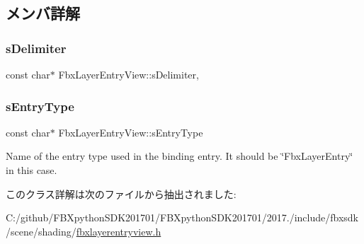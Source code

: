 \subsection{メンバ詳解}
\mbox{\label{class_fbx_layer_entry_view_a2143b40ee433ec7138342298b0cf76f3}} 
\subsubsection{\texorpdfstring{s\+Delimiter}{sDelimiter}}
{\footnotesize\ttfamily const char$\ast$ Fbx\+Layer\+Entry\+View\+::s\+Delimiter\hspace{0.3cm}{\ttfamily [static]}, {\ttfamily [protected]}}

\mbox{\label{class_fbx_layer_entry_view_aa8222d7ad3155f8e83652e030ab22e91}} 
\subsubsection{\texorpdfstring{s\+Entry\+Type}{sEntryType}}
{\footnotesize\ttfamily const char$\ast$ Fbx\+Layer\+Entry\+View\+::s\+Entry\+Type\hspace{0.3cm}{\ttfamily [static]}}

Name of the entry type used in the binding entry. It should be \char`\"{}\+Fbx\+Layer\+Entry\char`\"{} in this case. 

このクラス詳解は次のファイルから抽出されました\+:\begin{DoxyCompactItemize}
\item 
C\+:/github/\+F\+B\+Xpython\+S\+D\+K201701/\+F\+B\+Xpython\+S\+D\+K201701/2017./include/fbxsdk/scene/shading/\hyperlink{fbxlayerentryview_8h}{fbxlayerentryview.\+h}\end{DoxyCompactItemize}
